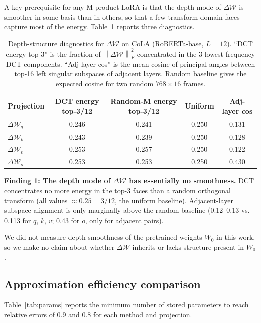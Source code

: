 \documentclass{article}
\newcommand{\DeltaW}{\Delta\mathcal{W}}
\newcommand{\norm}[1]{\left\|#1\right\|}
\theoremstyle{plain}
\begin{document}
A key prerequisite for any M-product LoRA is that the depth mode of $\DeltaW$
is smoother in some basis than in others, so that a few transform-domain faces
capture most of the energy.
Table~\ref{tab:depth_structure} reports three diagnostics.

\begin{table}[h]
\centering
\caption{Depth-structure diagnostics for $\DeltaW$ on CoLA (RoBERTa-base, $L=12$).
``DCT energy top-3'' is the fraction of $\norm{\DeltaW}_F^2$ concentrated in the
3 lowest-frequency DCT components. ``Adj-layer cos'' is the mean cosine of principal
angles between top-16 left singular subspaces of adjacent layers. Random baseline
gives the expected cosine for two random $768 \times 16$ frames.}
\label{tab:depth_structure}
\begin{tabular}{lcccc}
\toprule
Projection & DCT energy top-3/12 & Random-M energy top-3/12 & Uniform & Adj-layer cos \\
\midrule
$\DeltaW_q$ & 0.246 & 0.241 & 0.250 & 0.131 \\
$\DeltaW_k$ & 0.243 & 0.239 & 0.250 & 0.128 \\
$\DeltaW_v$ & 0.253 & 0.257 & 0.250 & 0.122 \\
$\DeltaW_o$ & 0.253 & 0.253 & 0.250 & 0.430 \\
\bottomrule
\end{tabular}
\end{table}

\textbf{Finding 1: The depth mode of $\DeltaW$ has essentially no smoothness.}
DCT concentrates no more energy in the top-3 faces than a random orthogonal transform
(all values $\approx 0.25 = 3/12$, the uniform baseline).
Adjacent-layer subspace alignment is only marginally above the random baseline
(0.12--0.13 vs. 0.113 for $q$, $k$, $v$; 0.43 for $o$, only for adjacent pairs).

We did not measure depth smoothness of the pretrained weights $W_0$ in this work, so we make no
claim about whether $\DeltaW$ inherits or lacks structure present in $W_0$.

\subsection{Approximation efficiency comparison}
\label{sec:approx_efficiency}

Table~\ref{tab:params} reports the minimum number of stored parameters to reach
relative errors of 0.9 and 0.8 for each method and projection.
\end{document}
